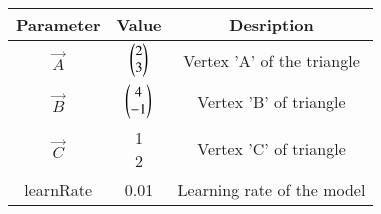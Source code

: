 
\begin{tabular}[]{|c|c|c|}
\hline
Parameter	& Value	& Desription \\ \hline
$\vec{A}$	& $\begin{pmatrix}2\\3\end{pmatrix}$ & Vertex 'A' of the triangle\\ \hline
$\vec{B}$	& $\begin{pmatrix}4\\-1\end{pmatrix}$ & Vertex 'B' of triangle\\ \hline
	$\vec{C}$		& \myvec{1\\2} & Vertex 'C' of triangle\\ \hline
learnRate	& 0.01 & Learning rate of the model\\ \hline
\end{tabular}
